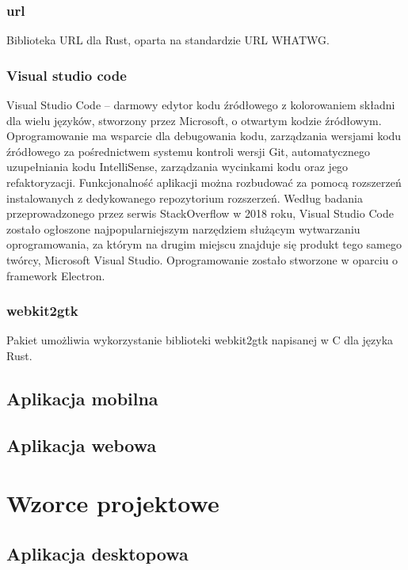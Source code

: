 \documentclass[12pt,a4paper]{article}
\begin{document}
				\subsubsection{url}

					\indent Biblioteka URL dla Rust, oparta na standardzie URL WHATWG.
				\subsubsection{Visual studio code}

					\indent Visual Studio Code – darmowy edytor kodu źródłowego z kolorowaniem składni dla wielu języków, stworzony przez Microsoft,
					o otwartym kodzie źródłowym. Oprogramowanie ma wsparcie dla debugowania kodu, zarządzania wersjami kodu źródłowego za pośrednictwem systemu kontroli wersji Git,
					automatycznego uzupełniania kodu IntelliSense, zarządzania wycinkami kodu oraz jego refaktoryzacji. Funkcjonalność aplikacji można rozbudować za pomocą rozszerzeń
					instalowanych z dedykowanego repozytorium rozszerzeń. Według badania przeprowadzonego przez serwis StackOverflow w 2018 roku, Visual Studio Code zostało
					ogłoszone najpopularniejszym narzędziem służącym wytwarzaniu oprogramowania, za którym na drugim miejscu znajduje się produkt tego samego twórcy,
					Microsoft Visual Studio. Oprogramowanie zostało stworzone w oparciu o framework Electron. 
				\subsubsection{webkit2gtk}

					\indent Pakiet umożliwia wykorzystanie biblioteki webkit2gtk napisanej w C dla języka Rust.

		\subsection{Aplikacja mobilna}
		\subsection{Aplikacja webowa}
	\newpage
	
	\section{Wzorce projektowe}
		\subsection{Aplikacja desktopowa}
\end{document}

